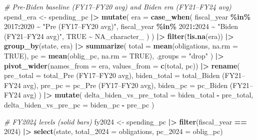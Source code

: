 \documentclass[
  11pt,
]{article}
\newenvironment{Shaded}{\begin{snugshade}}{\end{snugshade}}
\newcommand{\AttributeTok}[1]{\textcolor[rgb]{0.13,0.29,0.53}{#1}}
\newcommand{\CommentTok}[1]{\textcolor[rgb]{0.56,0.35,0.01}{\textit{#1}}}
\newcommand{\ConstantTok}[1]{\textcolor[rgb]{0.56,0.35,0.01}{#1}}
\newcommand{\DecValTok}[1]{\textcolor[rgb]{0.00,0.00,0.81}{#1}}
\newcommand{\FunctionTok}[1]{\textcolor[rgb]{0.13,0.29,0.53}{\textbf{#1}}}
\newcommand{\NormalTok}[1]{#1}
\newcommand{\OtherTok}[1]{\textcolor[rgb]{0.56,0.35,0.01}{#1}}
\newcommand{\SpecialCharTok}[1]{\textcolor[rgb]{0.81,0.36,0.00}{\textbf{#1}}}
\newcommand{\StringTok}[1]{\textcolor[rgb]{0.31,0.60,0.02}{#1}}
\begin{document}
\begin{Shaded}
\begin{Highlighting}[]
\CommentTok{\# Pre{-}Biden baseline (FY17–FY20 avg) and Biden era (FY21–FY24 avg)}
\NormalTok{spend\_era }\OtherTok{\textless{}{-}}\NormalTok{ spending\_pc }\SpecialCharTok{|\textgreater{}}
  \FunctionTok{mutate}\NormalTok{(}
    \AttributeTok{era =} \FunctionTok{case\_when}\NormalTok{(}
\NormalTok{      fiscal\_year }\SpecialCharTok{\%in\%} \DecValTok{2017}\SpecialCharTok{:}\DecValTok{2020} \SpecialCharTok{\textasciitilde{}} \StringTok{"Pre (FY17–FY20 avg)"}\NormalTok{,}
\NormalTok{      fiscal\_year }\SpecialCharTok{\%in\%} \DecValTok{2021}\SpecialCharTok{:}\DecValTok{2024} \SpecialCharTok{\textasciitilde{}} \StringTok{"Biden (FY21–FY24 avg)"}\NormalTok{,}
      \ConstantTok{TRUE} \SpecialCharTok{\textasciitilde{}} \ConstantTok{NA\_character\_}
\NormalTok{    )}
\NormalTok{  ) }\SpecialCharTok{|\textgreater{}}
  \FunctionTok{filter}\NormalTok{(}\SpecialCharTok{!}\FunctionTok{is.na}\NormalTok{(era)) }\SpecialCharTok{|\textgreater{}}
  \FunctionTok{group\_by}\NormalTok{(state, era) }\SpecialCharTok{|\textgreater{}}
  \FunctionTok{summarize}\NormalTok{(}
    \AttributeTok{total =} \FunctionTok{mean}\NormalTok{(obligations, }\AttributeTok{na.rm =} \ConstantTok{TRUE}\NormalTok{),}
    \AttributeTok{pc    =} \FunctionTok{mean}\NormalTok{(oblig\_pc, }\AttributeTok{na.rm =} \ConstantTok{TRUE}\NormalTok{),}
    \AttributeTok{.groups =} \StringTok{"drop"}
\NormalTok{  ) }\SpecialCharTok{|\textgreater{}}
  \FunctionTok{pivot\_wider}\NormalTok{(}\AttributeTok{names\_from =}\NormalTok{ era, }\AttributeTok{values\_from =} \FunctionTok{c}\NormalTok{(total, pc)) }\SpecialCharTok{|\textgreater{}}
  \FunctionTok{rename}\NormalTok{(}
    \AttributeTok{pre\_total   =} \StringTok{\textasciigrave{}}\AttributeTok{total\_Pre (FY17–FY20 avg)}\StringTok{\textasciigrave{}}\NormalTok{,}
    \AttributeTok{biden\_total =} \StringTok{\textasciigrave{}}\AttributeTok{total\_Biden (FY21–FY24 avg)}\StringTok{\textasciigrave{}}\NormalTok{,}
    \AttributeTok{pre\_pc      =} \StringTok{\textasciigrave{}}\AttributeTok{pc\_Pre (FY17–FY20 avg)}\StringTok{\textasciigrave{}}\NormalTok{,}
    \AttributeTok{biden\_pc    =} \StringTok{\textasciigrave{}}\AttributeTok{pc\_Biden (FY21–FY24 avg)}\StringTok{\textasciigrave{}}
\NormalTok{  ) }\SpecialCharTok{|\textgreater{}}
  \FunctionTok{mutate}\NormalTok{(}
    \AttributeTok{delta\_biden\_vs\_pre\_total =}\NormalTok{ biden\_total }\SpecialCharTok{{-}}\NormalTok{ pre\_total,}
    \AttributeTok{delta\_biden\_vs\_pre\_pc    =}\NormalTok{ biden\_pc }\SpecialCharTok{{-}}\NormalTok{ pre\_pc}
\NormalTok{  )}

\CommentTok{\# FY2024 levels (solid bars)}
\NormalTok{fy2024 }\OtherTok{\textless{}{-}}\NormalTok{ spending\_pc }\SpecialCharTok{|\textgreater{}}
  \FunctionTok{filter}\NormalTok{(fiscal\_year }\SpecialCharTok{==} \DecValTok{2024}\NormalTok{) }\SpecialCharTok{|\textgreater{}}
  \FunctionTok{select}\NormalTok{(state, }\AttributeTok{total\_2024 =}\NormalTok{ obligations, }\AttributeTok{pc\_2024 =}\NormalTok{ oblig\_pc)}


\end{Highlighting}
\end{Shaded}
\end{document}
